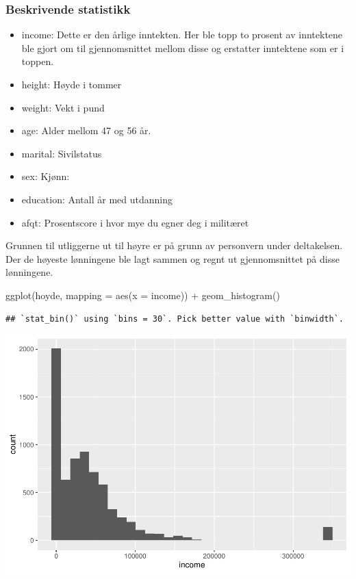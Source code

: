 \documentclass[
  12pt,
  norsk,
]{article}
\newenvironment{Shaded}{\begin{snugshade}}{\end{snugshade}}
\newcommand{\AttributeTok}[1]{\textcolor[rgb]{0.77,0.63,0.00}{#1}}
\newcommand{\FunctionTok}[1]{\textcolor[rgb]{0.00,0.00,0.00}{#1}}
\newcommand{\NormalTok}[1]{#1}
\newcommand{\SpecialCharTok}[1]{\textcolor[rgb]{0.00,0.00,0.00}{#1}}
\providecommand{\tightlist}{%
  \setlength{\itemsep}{0pt}\setlength{\parskip}{0pt}}
\begin{document}
\hypertarget{beskrivende-statistikk}{%
\subsubsection{Beskrivende statistikk}\label{beskrivende-statistikk}}

\begin{itemize}
\tightlist
\item
  income: Dette er den årlige inntekten. Her ble topp to prosent av
  inntektene ble gjort om til gjennomsnittet mellom disse og erstatter
  inntektene som er i toppen.
\item
  height: Høyde i tommer
\item
  weight: Vekt i pund
\item
  age: Alder mellom 47 og 56 år.
\item
  marital: Sivilstatus
\item
  sex: Kjønn:
\item
  education: Antall år med utdanning
\item
  afqt: Prosentscore i hvor mye du egner deg i militæret
\end{itemize}

Grunnen til utliggerne ut til høyre er på grunn av personvern under
deltakelsen. Der de høyeste lønningene ble lagt sammen og regnt ut
gjennomsnittet på disse lønningene.

\begin{Shaded}
\begin{Highlighting}[]
\FunctionTok{ggplot}\NormalTok{(hoyde, }\AttributeTok{mapping =} \FunctionTok{aes}\NormalTok{(}\AttributeTok{x =}\NormalTok{ income)) }\SpecialCharTok{+}
  \FunctionTok{geom\_histogram}\NormalTok{()}
\end{Highlighting}
\end{Shaded}

\begin{verbatim}
## `stat_bin()` using `bins = 30`. Pick better value with `binwidth`.
\end{verbatim}

\includegraphics{arbeidskrav2_files/figure-latex/unnamed-chunk-4-1.pdf}
\end{document}
